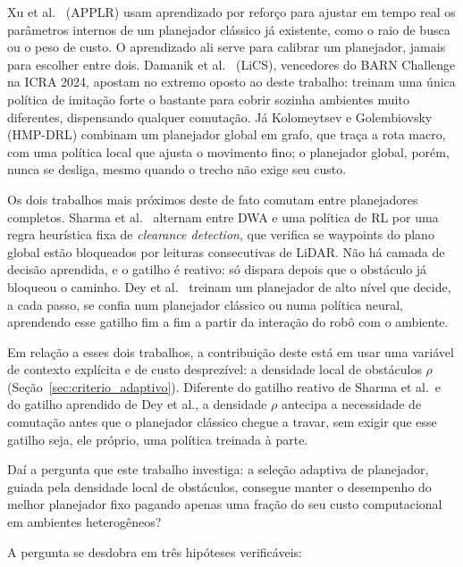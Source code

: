 \documentclass[12pt, a4paper]{article}
\begin{document}
Xu et al.\ \cite{Xu2020} (APPLR) usam aprendizado por reforço para ajustar em tempo real os
parâmetros internos de um planejador clássico já existente, como o raio de busca ou o peso de
custo. O aprendizado ali serve para calibrar um planejador, jamais para escolher entre dois.
Damanik et al.\
\cite{Damanik2024} (LiCS), vencedores do BARN Challenge na ICRA 2024, apostam no extremo oposto ao
deste trabalho: treinam uma única política de imitação forte o bastante para cobrir sozinha
ambientes muito diferentes, dispensando qualquer comutação. Já Kolomeytsev e Golembiovsky
\cite{Kolomeytsev2025} (HMP-DRL) combinam um planejador global em grafo, que traça a rota macro,
com uma política local que ajusta o movimento fino; o planejador global, porém, nunca se desliga,
mesmo quando o trecho não exige seu custo.

Os dois trabalhos mais próximos deste de fato comutam entre planejadores completos. Sharma et
al.\ \cite{Sharma2024} alternam entre DWA e uma política de RL por uma regra heurística fixa de
\textit{clearance detection}, que verifica se waypoints do plano global estão bloqueados por
leituras consecutivas de LiDAR. Não há camada de decisão aprendida, e o gatilho é reativo: só
dispara depois que o obstáculo já bloqueou o caminho. Dey et al.\ \cite{Dey2023} treinam um
planejador de alto nível que decide, a cada passo, se confia num planejador clássico ou numa
política neural, aprendendo esse gatilho fim a fim a partir da interação do robô com o ambiente.

Em relação a esses dois trabalhos, a contribuição deste está em usar uma variável de contexto
explícita e de custo desprezível: a densidade local de obstáculos $\rho$
(Seção~\ref{sec:criterio_adaptivo}). Diferente do gatilho reativo de Sharma et al.\ e do gatilho
aprendido de Dey et al., a densidade $\rho$ antecipa a necessidade de comutação antes que o
planejador clássico chegue a travar, sem exigir que esse gatilho seja, ele próprio, uma política
treinada à parte.

Daí a pergunta que este trabalho investiga: a seleção adaptiva de planejador, guiada pela
densidade local de obstáculos, consegue manter o desempenho do melhor planejador fixo pagando
apenas uma fração do seu custo computacional em ambientes heterogêneos?

A pergunta se desdobra em três hipóteses verificáveis:
\end{document}
